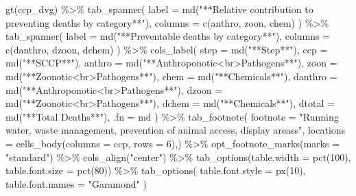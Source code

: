 \documentclass[
  letterpaper,
  DIV=11,
  numbers=noendperiod]{scrartcl}
\newenvironment{Shaded}{\begin{snugshade}}{\end{snugshade}}
\newcommand{\AttributeTok}[1]{\textcolor[rgb]{0.40,0.45,0.13}{#1}}
\newcommand{\DecValTok}[1]{\textcolor[rgb]{0.68,0.00,0.00}{#1}}
\newcommand{\FunctionTok}[1]{\textcolor[rgb]{0.28,0.35,0.67}{#1}}
\newcommand{\NormalTok}[1]{\textcolor[rgb]{0.00,0.23,0.31}{#1}}
\newcommand{\SpecialCharTok}[1]{\textcolor[rgb]{0.37,0.37,0.37}{#1}}
\newcommand{\StringTok}[1]{\textcolor[rgb]{0.13,0.47,0.30}{#1}}
\begin{document}
\begin{Shaded}
\begin{Highlighting}[]
\FunctionTok{gt}\NormalTok{(ccp\_dvg) }\SpecialCharTok{\%\textgreater{}\%} 
  \FunctionTok{tab\_spanner}\NormalTok{(}
    \AttributeTok{label =} \FunctionTok{md}\NormalTok{(}\StringTok{"**Relative contribution to preventing deaths by category**"}\NormalTok{),}
    \AttributeTok{columns =} \FunctionTok{c}\NormalTok{(anthro, zoon, chem)}
\NormalTok{  ) }\SpecialCharTok{\%\textgreater{}\%} 
  \FunctionTok{tab\_spanner}\NormalTok{(}
  \AttributeTok{label =} \FunctionTok{md}\NormalTok{(}\StringTok{"**Preventable deaths by category**"}\NormalTok{),}
  \AttributeTok{columns =} \FunctionTok{c}\NormalTok{(danthro, dzoon, dchem)}
\NormalTok{  ) }\SpecialCharTok{\%\textgreater{}\%} 
  \FunctionTok{cols\_label}\NormalTok{(}
\AttributeTok{step =} \FunctionTok{md}\NormalTok{(}\StringTok{"**Step**"}\NormalTok{),}
\AttributeTok{ccp =} \FunctionTok{md}\NormalTok{(}\StringTok{"**SCCP**"}\NormalTok{),}
\AttributeTok{anthro =} \FunctionTok{md}\NormalTok{(}\StringTok{"**Anthroponotic\textless{}br\textgreater{}Pathogens**"}\NormalTok{),}
\AttributeTok{zoon =} \FunctionTok{md}\NormalTok{(}\StringTok{"**Zoonotic\textless{}br\textgreater{}Pathogens**"}\NormalTok{),}
\AttributeTok{chem =} \FunctionTok{md}\NormalTok{(}\StringTok{"**Chemicals**"}\NormalTok{),}
\AttributeTok{danthro =} \FunctionTok{md}\NormalTok{(}\StringTok{"**Anthroponotic\textless{}br\textgreater{}Pathogens**"}\NormalTok{),}
\AttributeTok{dzoon =} \FunctionTok{md}\NormalTok{(}\StringTok{"**Zoonotic\textless{}br\textgreater{}Pathogens**"}\NormalTok{),}
\AttributeTok{dchem =} \FunctionTok{md}\NormalTok{(}\StringTok{"**Chemicals**"}\NormalTok{),}
\AttributeTok{dtotal =} \FunctionTok{md}\NormalTok{(}\StringTok{"**Total Deaths**"}\NormalTok{),}
\AttributeTok{.fn =}\NormalTok{ md}
\NormalTok{) }\SpecialCharTok{\%\textgreater{}\%} 
  \FunctionTok{tab\_footnote}\NormalTok{(}
    \AttributeTok{footnote =} \StringTok{"Running water, waste management, prevention of animal access, display areass"}\NormalTok{,}
    \AttributeTok{locations =} \FunctionTok{cells\_body}\NormalTok{(}\AttributeTok{columns =}\NormalTok{ ccp, }\AttributeTok{rows =} \DecValTok{6}\NormalTok{),) }\SpecialCharTok{\%\textgreater{}\%} 
  \FunctionTok{opt\_footnote\_marks}\NormalTok{(}\AttributeTok{marks =} \StringTok{"standard"}\NormalTok{) }\SpecialCharTok{\%\textgreater{}\%} 
  \FunctionTok{cols\_align}\NormalTok{(}\StringTok{"center"}\NormalTok{) }\SpecialCharTok{\%\textgreater{}\%} 
\FunctionTok{tab\_options}\NormalTok{(}\AttributeTok{table.width =} \FunctionTok{pct}\NormalTok{(}\DecValTok{100}\NormalTok{), }\AttributeTok{table.font.size =} \FunctionTok{pct}\NormalTok{(}\DecValTok{80}\NormalTok{)) }\SpecialCharTok{\%\textgreater{}\%} 
  \FunctionTok{tab\_options}\NormalTok{(}
    \AttributeTok{table.font.style =} \FunctionTok{px}\NormalTok{(}\DecValTok{10}\NormalTok{),}
    \AttributeTok{table.font.names =} \StringTok{"Garamond"}
\NormalTok{  )}
\end{Highlighting}
\end{Shaded}
\end{document}
